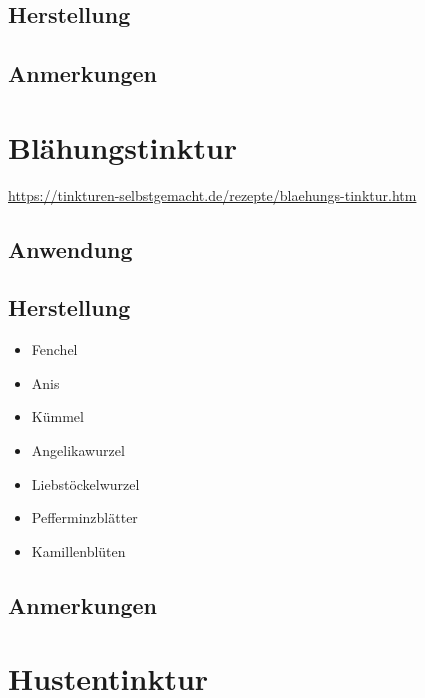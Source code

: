 \subsection{Herstellung}
\subsection{Anmerkungen}



\newpage



\section{Blähungstinktur}


\cite{tinkturen}  

\url{https://tinkturen-selbstgemacht.de/rezepte/blaehungs-tinktur.htm}

\subsection{Anwendung}

\subsection{Herstellung}
\begin{itemize}
	\item Fenchel
	\item Anis
	\item Kümmel
	\item Angelikawurzel
	\item Liebstöckelwurzel
	\item Pefferminzblätter
	\item Kamillenblüten
\end{itemize}

\subsection{Anmerkungen}



\newpage



\section{Hustentinktur}


